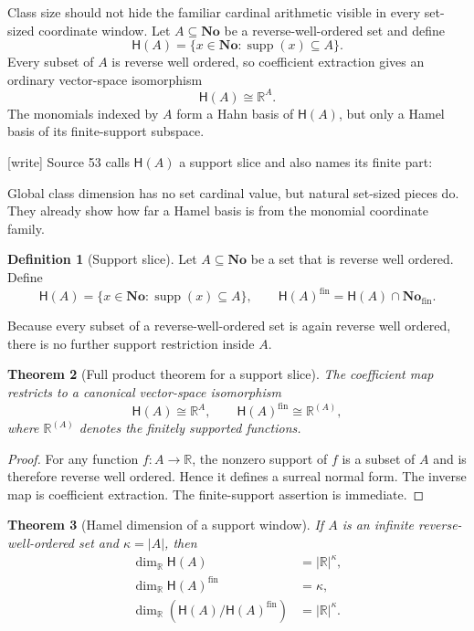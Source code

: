 \documentclass[11pt,letterpaper]{article}
\numberwithin{equation}{section}
\newtheorem{theorem}{Theorem}[section]
\theoremstyle{definition}
\newtheorem{definition}[theorem]{Definition}
\theoremstyle{remark}
\newcommand{\No}{\mathbf{No}}
\newcommand{\R}{\mathbb{R}}
\newcommand{\Hahn}{\mathsf{H}}
\newcommand{\Fin}{\No_{\mathrm{fin}}}
\newcommand{\supp}{\operatorname{supp}}
\newcommand{\wtag}{\textup{[write]}}%
\begin{document}
Class size should not hide the familiar cardinal arithmetic visible in every
set-sized coordinate window.  Let \(A\subseteq\No\) be a reverse-well-ordered
set and define
\begin{equation}\label{rvs:eq:H-A}
  \Hahn(A)=\{x\in\No:\supp(x)\subseteq A\}.
\end{equation}
Every subset of \(A\) is reverse well ordered, so coefficient extraction gives
an ordinary vector-space isomorphism
\begin{equation}\label{rvs:eq:H-A-product}
  \Hahn(A)\cong\R^A.
\end{equation}
The monomials indexed by \(A\) form a Hahn basis of \(\Hahn(A)\), but only a
Hamel basis of its finite-support subspace.

\noindent\wtag{} Source 53 calls \(\Hahn(A)\) a support slice and also names
its finite part:

Global class dimension has no set cardinal value, but natural set-sized pieces do.
They already show how far a Hamel basis is from the monomial coordinate family.

\begin{definition}[Support slice]
Let $A\subseteq\No$ be a set that is reverse well ordered. Define
\[
  \Hahn(A)=\{x\in\No:\supp(x)\subseteq A\},
  \qquad
  \Hahn(A)^{\mathrm{fin}}=\Hahn(A)\cap\Fin.
\]
\end{definition}

Because every subset of a reverse-well-ordered set is again reverse well ordered,
there is no further support restriction inside $A$.

\begin{theorem}[Full product theorem for a support slice]\label{rvs:cv:thm:slice-product}
The coefficient map restricts to a canonical vector-space isomorphism
\[
  \Hahn(A)\cong\R^A,
  \qquad
  \Hahn(A)^{\mathrm{fin}}\cong\R^{(A)},
\]
where $\R^{(A)}$ denotes the finitely supported functions.
\end{theorem}

\begin{proof}
For any function $f:A\to\R$, the nonzero support of $f$ is a subset of $A$ and
is therefore reverse well ordered. Hence it defines a surreal normal form. The
inverse map is coefficient extraction. The finite-support assertion is immediate.
\end{proof}

\begin{theorem}[Hamel dimension of a support window]
\label{rvs:thm:window-dimension}\label{rvs:cv:thm:slice-dimension}
If \(A\) is an infinite reverse-well-ordered set and \(\kappa=\lvert A\rvert\), then
\begin{align}
  \dim_{\R}\Hahn(A)&=\lvert\R\rvert^{\kappa},\label{rvs:eq:window-dim}\\
  \dim_{\R}\Hahn(A)^{\mathrm{fin}} &= \kappa,\label{rvs:cv:eq:finite-slice-dim}\\
  \dim_{\R}(\Hahn(A)/\Hahn(A)^{\mathrm{fin}}) &= \lvert\R\rvert^\kappa.\label{rvs:cv:eq:quotient-slice-dim}
\end{align}
\end{theorem}
\end{document}
